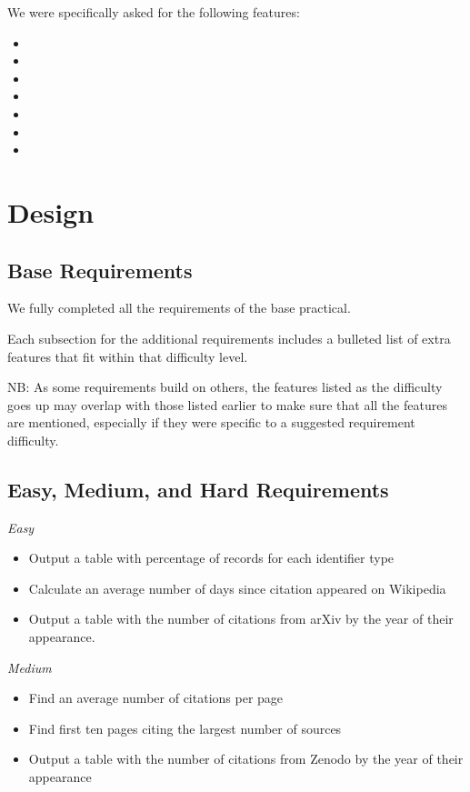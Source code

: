 \documentclass[12pt,a4paper,final]{article}
\begin{document}
We were specifically asked for the following features:

\begin{itemize}[noitemsep]
	\item
    \item
    \item
    \item
    \item
    \item
    \item
\end{itemize}

\section*{Design}

\subsection*{Base Requirements}

We fully completed all the requirements of the base practical.

Each subsection for the additional requirements includes a bulleted list of
extra features that fit within that difficulty level.

NB: As some requirements build on others, the features listed as the difficulty goes
up may overlap with those listed earlier to make sure that all the features are mentioned,
especially if they were specific to a suggested requirement difficulty.

\subsection*{Easy, Medium, and Hard Requirements}
\begin{center} \emph{Easy} \end{center}
\begin{itemize}[noitemsep]
    \item Output a table with percentage of records for each identifier type
    \item Calculate an average number of days since citation appeared on Wikipedia
    \item Output a table with the number of citations from arXiv by the year of their appearance.
\end{itemize}

\begin{center} \emph{Medium} \end{center}
\begin{itemize}[noitemsep]
    \item Find an average number of citations per page
    \item Find first ten pages citing the largest number of sources
    \item Output a table with the number of citations from Zenodo by the year of their appearance
\end{itemize}
\end{document}
